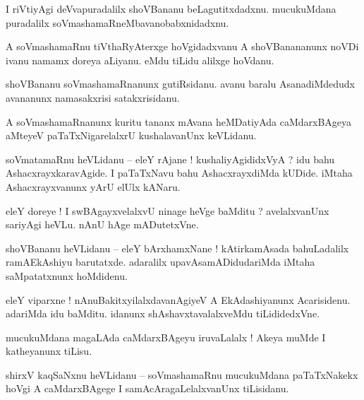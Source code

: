\documentclass{article}
\begin{document}
\begin{mn}%
I riVtiyAgi deVvapuradalilx shoVBananu beLagutitxdadxnu. mucukuMdana puradalilx 
soVmashamaRneMbavanobabxnidadxnu.
\end{mn}

\begin{mn}%
A soVmashamaRnu tiVthaRyAterxge hoVgidadxvanu A shoVBanananunx noVDi ivanu namamx doreya aLiyanu. 
eMdu tiLidu alilxge hoVdanu.
\end{mn}

\begin{mn}%
shoVBananu soVmashamaRnanunx gutiRsidanu. avanu baralu AsanadiMdedudx avananunx namasakxrisi 
satakxrisidanu.
\end{mn}

\begin{mn}%
A soVmashamaRnanunx kuritu tananx mAvana heMDatiyAda caMdarxBAgeya aMteyeV paTaTxNigarelalxrU 
kushalavanUnx keVLidanu.
\end{mn}

\begin{mn}%
soVmatamaRnu heVLidanu -- eleY rAjane ! kushaliyAgididxVyA ? idu bahu AshacxrayxkaravAgide. I 
paTaTxNavu bahu AshacxrayxdiMda kUDide. iMtaha Ashacxrayxvanunx yArU elUlx kANaru.
\end{mn}

\begin{mn}%
eleY doreye ! I swBAgayxvelalxvU ninage heVge baMditu ? avelalxvanUnx sariyAgi heVLu. nAnU hAge 
mADutetxVne.
\end{mn}

\begin{mn}%
shoVBananu heVLidanu -- eleY bArxhamxNane ! kAtirkamAsada bahuLadalilx ramAEkAshiyu barutatxde. 
adaralilx upavAsamADidudariMda iMtaha saMpatatxnunx hoMdidenu.
\end{mn}

\begin{mn}%
eleY viparxne ! nAnuBakitxyilalxdavanAgiyeV A EkAdashiyanunx Acarisidenu. adariMda idu baMditu. 
idanunx shAshavxtavalalxveMdu tiLididedxVne.
\end{mn}

\begin{mn}%
mucukuMdana magaLAda caMdarxBAgeyu iruvaLalalx ! Akeya muMde I katheyanunx tiLisu.
\end{mn}

\begin{mn}%
shirxV kaqSaNxnu heVLidanu -- soVmashamaRnu mucukuMdana paTaTxNakekx hoVgi A caMdarxBAgege I 
samAcAragaLelalxvanUnx tiLisidanu.
\end{mn}
\end{document}
